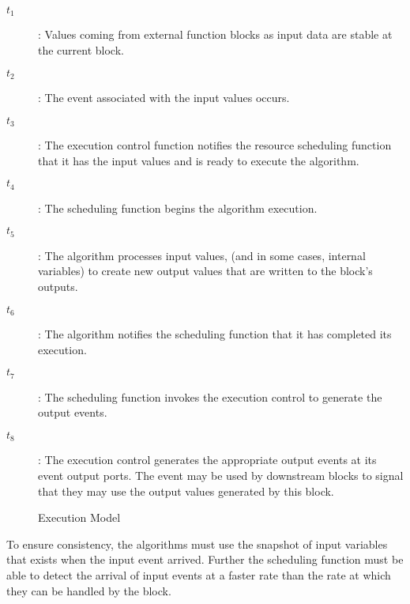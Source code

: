 \begin{description}
\item[$t_1$]: Values coming from external function blocks
as input data are stable at the current block.
\item[$t_2$]: The event associated with the input values occurs.
\item[$t_3$]: The execution control function notifies the resource
scheduling function that it has the input values and is ready to
execute the algorithm.
\item[$t_4$]: The scheduling function begins the algorithm execution.
\item[$t_5$]: The algorithm processes input values, (and in some
cases, internal variables) to create new output values that are
written to the block's outputs.
\item[$t_6$]: The algorithm notifies the scheduling function that it
has completed its execution.
\item[$t_7$]: The scheduling function invokes the execution control
to generate the output events.
\item[$t_8$]: The execution control generates the appropriate output
events at its event output ports. The event may be used by
downstream blocks to signal that they may use the output values
generated by this block.
\end{description}

%
\begin{figure}
\begin{center}
\caption[Execution Model]{Execution Model{\protect
~\cite{iec:61499:2000}}} \label{f:Execution_Model}
\end{center}
\end{figure}
%

To ensure consistency, the algorithms must use the snapshot of
input variables that exists when the input event arrived. Further
the scheduling function must be able to detect the arrival of
input events at a faster rate than the rate at which they can be
handled by the block.



